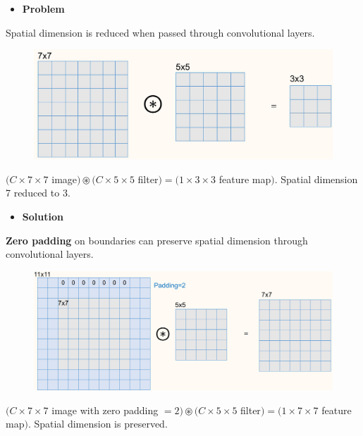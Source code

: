 \documentclass{report}
\begin{document}
\begin{concept}
    \begin{itemize}
        \item \textbf{Problem}
    \end{itemize}

    Spatial dimension is reduced when passed through convolutional layers.

    \begin{figure}[H]
        \centering
        \includegraphics[width=1.0\textwidth]{.././assets/5.3.jpg}
    \end{figure}

    $(C \times 7 \times 7$ image$) \circledast(C \times 5 \times 5$ filter$)=(1 \times 3 \times 3$ feature map$)$.
    Spatial dimension 7 reduced to 3.

    \par\noindent\textcolor{gray}{\hdashrule{\textwidth}{0.4pt}{1pt 2pt}}

    \begin{itemize}
        \item \textbf{Solution}
    \end{itemize}

    \textbf{Zero padding} on boundaries can preserve spatial dimension through convolutional layers.

    \begin{figure}[H]
        \centering
        \includegraphics[width=1.0\textwidth]{.././assets/5.4.png}
    \end{figure}

    $(C \times 7 \times 7$ image with zero padding $=2) \circledast(C \times 5 \times 5$ filter$)=(1 \times 7 \times 7$ feature map$)$.
    Spatial dimension is preserved.
\end{concept}
\end{document}
